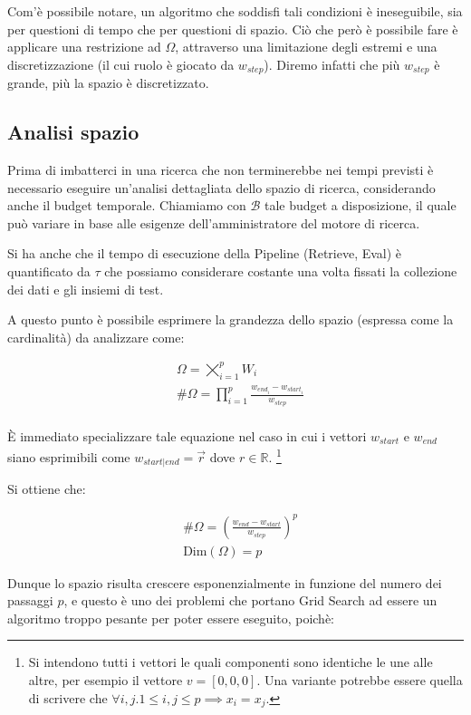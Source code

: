 Com'è possibile notare, un algoritmo che soddisfi tali condizioni è
ineseguibile, sia per questioni di tempo che per questioni di spazio.
Ciò che però è possibile fare è applicare una restrizione ad $\Omega$, attraverso
una limitazione degli estremi e una discretizzazione (il cui ruolo è giocato da $w_{step}$).
Diremo infatti che più $w_{step}$ è grande, più la spazio è discretizzato.

\subsection{Analisi spazio}

Prima di imbatterci in una ricerca che non terminerebbe nei tempi previsti è necessario
eseguire un'analisi dettagliata dello spazio di ricerca, considerando anche il budget temporale.
Chiamiamo con $\mathcal{B}$ tale budget a disposizione, il quale
può variare in base alle esigenze dell'amministratore
del motore di ricerca.

Si ha anche che il tempo di esecuzione della Pipeline (Retrieve, Eval) è quantificato
da $\tau$ che possiamo considerare costante una volta fissati la collezione dei dati e gli insiemi di test.

A questo punto è possibile esprimere la grandezza dello spazio (espressa come la cardinalità) da analizzare come:

\begin{align*}\label{eq:gsdim}
& \Omega = \bigtimes_{i=1}^{p} W_i \\
& \#\Omega = \prod\limits_{i=1}^{p} \frac{w_{end_i} - w_{start_i}}{w_{step}} \\
\end{align*}

\`E immediato specializzare tale equazione nel caso in cui i vettori $w_{start}$ e $w_{end}$
siano esprimibili come $w_{start|end} = \vec{r}$ dove $r \in \mathbb{R}$. \footnote{
	Si intendono tutti i vettori le quali componenti sono identiche le une alle altre, per esempio il vettore $v = \left[0, 0, 0\right]$.
	Una variante potrebbe essere quella di scrivere che $\forall{i,j.1 \leq i,j \leq p} \implies x_i = x_j$.
}


Si ottiene che:

\begin{align*}
& \#\Omega = \left(\frac{w_{end} - w_{start}}{w_{step}}\right)^{p} \\
& \text{Dim}\left( \Omega\right) = p
\end{align*}

Dunque lo spazio risulta crescere esponenzialmente in funzione del numero
dei passaggi $p$, e questo è uno dei problemi che portano Grid Search ad essere
un algoritmo troppo pesante per poter essere eseguito, poichè:

